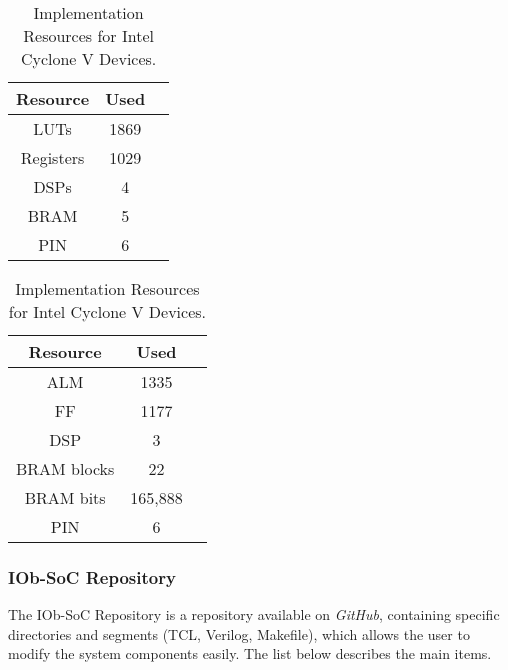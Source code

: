 \begin{table}[H]
\parbox{.45\linewidth}{
\centering
\begin{tabular}{|c|c|c|}
        \hline
         \textbf{Resource} & \textbf{Used}  \\
         \hline
         LUTs & 1869 \\
         \hline
         Registers & 1029 \\
         \hline
         DSPs & 4 \\
         \hline
         BRAM & 5 \\
         \hline
         PIN & 6 \\
         \hline
\end{tabular}
\caption{Implementation Resources for Xilinx Kintex
Ultrascale Devices.}
\label{tab:resorucesxilinx}
}
\hfill
\parbox{.45\linewidth}{
\centering
\begin{tabular}{|c|c|c|}
        \hline
         \textbf{Resource} & \textbf{Used}  \\
         \hline
         ALM & 1335 \\
         \hline
         FF & 1177 \\
         \hline
         DSP & 3 \\
         \hline
         BRAM blocks & 22 \\
         \hline
         BRAM bits & 165,888 \\
         \hline
         PIN & 6 \\
         \hline
\end{tabular}
\caption{Implementation Resources for Intel Cyclone
V Devices.}
\label{tab:resorucescyclone}
}
\end{table}


\subsubsection{IOb-SoC Repository}

The IOb-SoC Repository is a repository available on \textit{GitHub}, containing specific directories and segments (TCL, Verilog, Makefile), which allows the user to modify the system components easily. The list below describes the main items.

